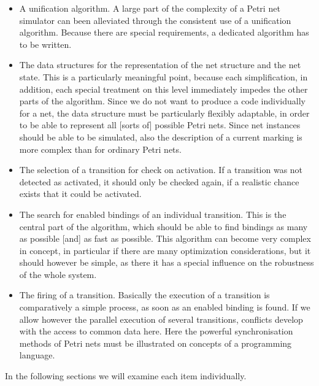 \begin{itemize}
\item A unification algorithm.
A large part of the complexity of a Petri net simulator can been 
alleviated through the consistent use of a unification algorithm.
Because there are special requirements, a dedicated algorithm has 
to be written.

\item The data structures for the representation of the net structure 
and the net state. This is a particularly meaningful point, because 
each simplification, in addition, each special treatment on this level 
immediately impedes the other parts of the algorithm. Since we do not 
want to produce a code individually for a net, the data structure must 
be particularly flexibly adaptable, in order to be able to represent 
all [sorts of] possible Petri nets. Since net instances should be 
able to be simulated, also the description of a current marking is 
more complex than for ordinary Petri nets.

\item The selection of a transition for check on activation. If a 
transition was not detected as activated, it should only be checked 
again, if a realistic chance exists that it could be activated.

\item The search for enabled bindings of an individual transition. 
This is the central part of the algorithm, which should be able to 
find bindings as many as possible [and] as fast as possible. This 
algorithm can become very complex in concept, in particular if 
there are many optimization considerations, but it should however 
be simple, as there it has a special influence on the robustness 
of the whole system. 

\item The firing of a transition. Basically the execution of a 
transition is comparatively a simple process, as soon as an enabled 
binding is found. If we allow however the parallel execution of several 
transitions, conflicts develop with the access to common data here. 
Here the powerful synchronisation methods of Petri nets must be 
illustrated on concepts of a programming language. 
\end{itemize}

In the following sections we will examine each item individually.

